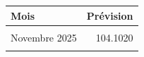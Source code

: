 \centering
\centering
\begin{tabular}[t]{lr}
\toprule
Mois & Prévision\\
\midrule
\cellcolor{gray!10}{Octobre 2025} & \cellcolor{gray!10}{103.9351}\\
Novembre 2025 & 104.1020\\
\cellcolor{gray!10}{Décembre 2025} & \cellcolor{gray!10}{104.0432}\\
\bottomrule
\end{tabular}


